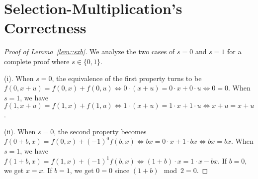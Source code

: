 \section{Selection-Multiplication's Correctness}
\label{sec:proof_lemma}
\begin{proof}[Proof of Lemma~\ref{lem::sxb}]
We analyze the two cases of $s=0$ and $s=1$ for a complete proof where $s \in \{0, 1\}$.

(i). When $s=0$, the equivalence of the first property turns to be $f(0,x+u)=f(0,x)+f(0,u) \Leftrightarrow 0\cdot(x+u) = 0\cdot x+ 0\cdot u \Leftrightarrow 0=0$.
When $s=1$, we have $f(1,x+u)=f(1,x)+f(1,u) \Leftrightarrow 1\cdot(x+u) = 1\cdot x+ 1\cdot u \Leftrightarrow x+u=x+u$.

(ii). When $s=0$, the %
second property %
becomes $f(0+b,x)=f(0,x)+(-1)^0f(b,x) \Leftrightarrow bx = 0\cdot x+ 1\cdot bx \Leftrightarrow bx = bx$.
When $s=1$, we have $f(1+b,x)=f(1,x)+(-1)^1f(b,x) \Leftrightarrow (1+b)\cdot x = 1\cdot x - bx$.
If $b=0$, we get $x=x$.
If $b=1$, we get $0=0$ since $(1+b)\!\!\!\!\mod 2=0$.
\end{proof}